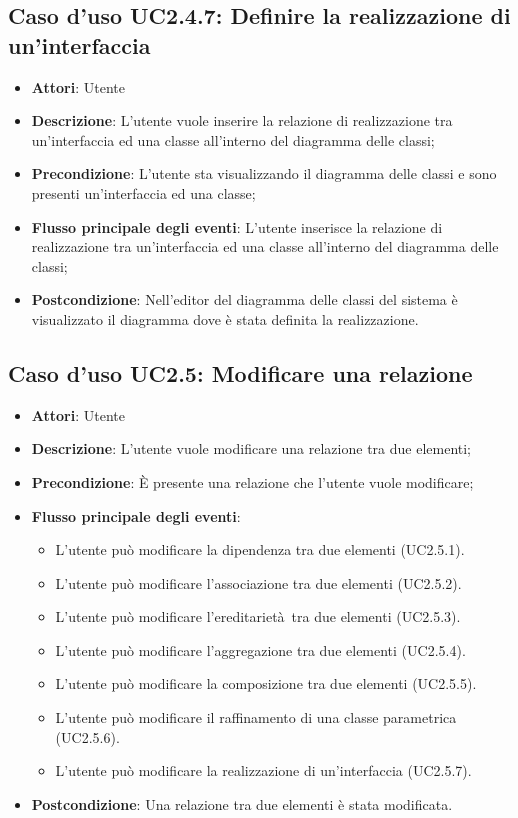 \documentclass[../AnalisiDeiRequisiti.tex]{subfiles}
\begin{document}
		\subsection{Caso d'uso UC2.4.7: Definire la realizzazione di un'interfaccia}
		\begin{itemize}
			\item \textbf{Attori}: Utente
			\item \textbf{Descrizione}: L'utente vuole inserire la relazione di realizzazione tra  un'interfaccia ed una classe all'interno del diagramma delle classi;
			\item \textbf{Precondizione}: L'utente sta visualizzando il diagramma delle classi e sono presenti un'interfaccia ed una classe;
			\item \textbf{Flusso principale degli eventi}: L'utente inserisce la relazione di realizzazione tra un'interfaccia ed una classe all'interno del diagramma delle classi;
			\item \textbf{Postcondizione}: Nell'editor del diagramma delle classi del sistema è visualizzato il diagramma dove è stata definita la realizzazione.
		\end{itemize}
		\subsection{Caso d'uso UC2.5: Modificare una relazione}
		\begin{itemize}
			\item \textbf{Attori}: Utente
			\item \textbf{Descrizione}: L'utente vuole modificare una relazione tra due elementi;
			\item \textbf{Precondizione}: È presente una relazione che l'utente vuole modificare;
			\item \textbf{Flusso principale degli eventi}: \begin{itemize}
				\item L'utente può modificare la dipendenza tra due elementi (UC2.5.1).
				\item L'utente può modificare l'associazione tra due elementi (UC2.5.2).
				\item L'utente può modificare l'ereditarietà tra due elementi (UC2.5.3).
				\item L'utente può modificare l'aggregazione tra due elementi (UC2.5.4).
				\item L'utente può modificare la composizione tra due elementi (UC2.5.5).
				\item L'utente può modificare il raffinamento di una classe parametrica (UC2.5.6).
				\item L'utente può modificare la realizzazione di un'interfaccia (UC2.5.7).
			\end{itemize}
			\item \textbf{Postcondizione}: Una relazione tra due elementi è stata modificata.
		\end{itemize}
\end{document}
